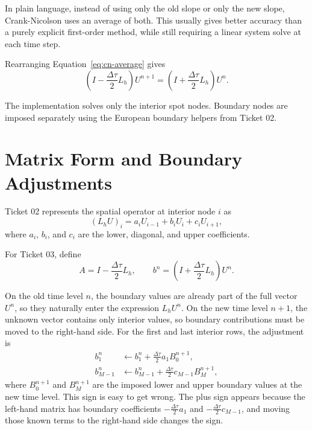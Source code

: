 \documentclass[11pt,a4paper]{article}
\begin{document}
In plain language, instead of using only the old slope or only the new slope, Crank-Nicolson uses
an average of both. This usually gives better accuracy than a purely explicit first-order method,
while still requiring a linear system solve at each time step.

Rearranging Equation~\ref{eq:cn-average} gives
\begin{equation}
  \left(I - \frac{\Delta \tau}{2}L_h\right)U^{n+1}
  =
  \left(I + \frac{\Delta \tau}{2}L_h\right)U^n.
  \label{eq:cn-matrix}
\end{equation}

The implementation solves only the interior spot nodes. Boundary nodes are imposed separately
using the European boundary helpers from Ticket 02.

\section{Matrix Form and Boundary Adjustments}

Ticket 02 represents the spatial operator at interior node \(i\) as
\begin{equation}
  (L_h U)_i = a_i U_{i-1} + b_i U_i + c_i U_{i+1},
  \label{eq:lh-row}
\end{equation}
where \(a_i\), \(b_i\), and \(c_i\) are the lower, diagonal, and upper coefficients.

For Ticket 03, define
\begin{equation}
  A = I - \frac{\Delta \tau}{2}L_h,
  \qquad
  b^n = \left(I + \frac{\Delta \tau}{2}L_h\right)U^n.
\end{equation}

On the old time level \(n\), the boundary values are already part of the full vector \(U^n\), so
they naturally enter the expression \(L_h U^n\). On the new time level \(n+1\), the unknown vector
contains only interior values, so boundary contributions must be moved to the right-hand side.
For the first and last interior rows, the adjustment is
\begin{align}
  b^n_1 &\leftarrow b^n_1
    + \frac{\Delta \tau}{2} a_1 B^{n+1}_0, \\
  b^n_{M-1} &\leftarrow b^n_{M-1}
    + \frac{\Delta \tau}{2} c_{M-1} B^{n+1}_M,
\end{align}
where \(B^{n+1}_0\) and \(B^{n+1}_M\) are the imposed lower and upper boundary values at the new
time level. This sign is easy to get wrong. The plus sign appears because the left-hand matrix has
boundary coefficients \(-\frac{\Delta \tau}{2}a_1\) and
\(-\frac{\Delta \tau}{2}c_{M-1}\), and moving those known terms to the right-hand side changes the
sign.
\end{document}
